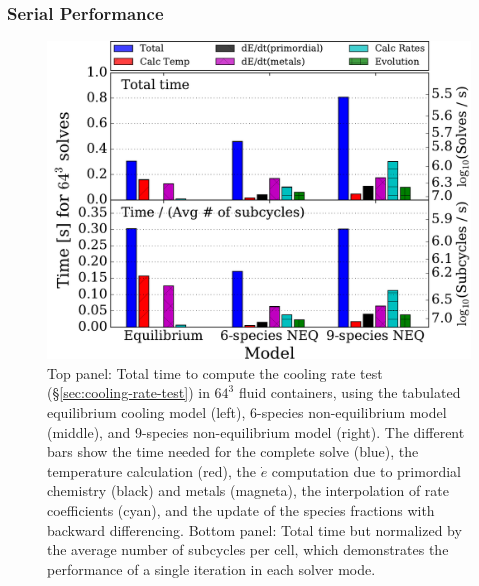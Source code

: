 \subsubsection{Serial Performance}

\begin{figure}
  \centering
  \includegraphics[width=\columnwidth]{performance.pdf}
  \caption{Top panel: Total time to compute the cooling rate test
    (\S\ref{sec:cooling-rate-test}) in $64^3$ fluid containers, using
    the tabulated equilibrium cooling model (left), 6-species
    non-equilibrium model (middle), and 9-species non-equilibrium
    model (right).  The different bars show the time needed for the
    complete solve (blue), the temperature calculation (red), the
    $\dot{e}$ computation due to primordial chemistry (black) and
    metals (magneta), the interpolation of rate coefficients (cyan),
    and the update of the species fractions with backward
    differencing.  Bottom panel: Total time but normalized by the
    average number of subcycles per cell, which demonstrates the
    performance of a single iteration in each solver
    mode.} \label{fig:performance}
\end{figure}

